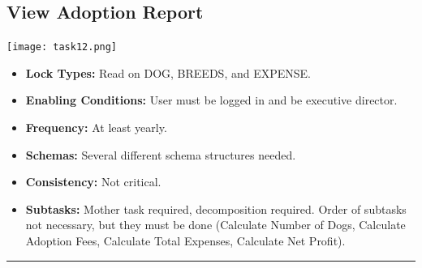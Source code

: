 \documentclass{article}
\begin{document}
\subsection{View Adoption Report}
\begin{center}
    \texttt{[image: task12.png]}
\end{center}
\begin{itemize}
    \item \textbf{Lock Types:} Read on DOG, BREEDS, and EXPENSE.
    \item \textbf{Enabling Conditions:} User must be logged in and be executive director.
    \item \textbf{Frequency:} At least yearly.
    \item \textbf{Schemas:} Several different schema structures needed.
    \item \textbf{Consistency:} Not critical.
    \item \textbf{Subtasks:} Mother task required, decomposition required. Order of subtasks not necessary, but they must be done (Calculate Number of Dogs, Calculate Adoption Fees, Calculate Total Expenses, Calculate Net Profit).
\end{itemize}
\noindent\rule{8cm}{0.4pt}
\end{document}
